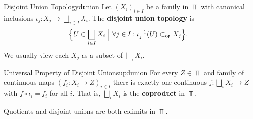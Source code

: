 \begin{definition}{Disjoint Union Topology}{dunion}
    Let $(X_i)_{i\in I}$ be a family in $\Top$ with canonical inclusions $\iota_j:X_j\to\bigsqcup_{i\in I}X_i$. The \textbf{disjoint union topology} is \[
    \Big\{U\subset\bigsqcup_{i\in I}X_i \ \Big|\ \forall j\in I:\iota_j\inv(U)\subset_{\text{op}}X_j\Big\}.
    \]
    We usually view each $X_j$ as a subset of $\bigsqcup_{i}X_i$.
\end{definition}

\begin{theorem}{Universal Property of Disjoint Unions}{updunion}
    For every $Z\in\Top$ and family of continuous maps $(f_i:X_i\to Z)_{i\in I}$ there is exactly one continuous $f:\bigsqcup_{i}X_i\to Z$ with $f\circ\iota_i=f_i$ for all $i$. That is, $\bigsqcup_i X_i$ is the \textbf{coproduct} in $\Top$.
\end{theorem}

Quotients and disjoint unions are both colimits in $\Top$.
